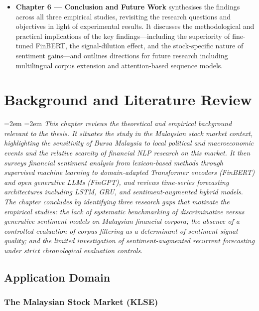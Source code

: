 \documentclass[12pt]{ucetd}
\newcommand{\chapterabstract}[1]{%
  \par\vspace{1em}
  \begingroup
  \leftskip=2em
  \rightskip=2em
  \noindent\itshape
  #1
  \par
  \endgroup
  \vspace{1.5em}
}
\begin{document}
\begin{itemize}
    \item \textbf{Chapter 6 --- Conclusion and Future Work} synthesises the findings across all three empirical studies, revisiting the research questions and objectives in light of experimental results. It discusses the methodological and practical implications of the key findings---including the superiority of fine-tuned FinBERT, the signal-dilution effect, and the stock-specific nature of sentiment gains---and outlines directions for future research including multilingual corpus extension and attention-based sequence models.
\end{itemize}





\chapter{Background and Literature Review}

\chapterabstract{This chapter reviews the theoretical and empirical background relevant to the thesis. It situates the study in the Malaysian stock market context, highlighting the sensitivity of Bursa Malaysia to local political and macroeconomic events and the relative scarcity of financial NLP research on this market. It then surveys financial sentiment analysis from lexicon-based methods through supervised machine learning to domain-adapted Transformer encoders (FinBERT) and open generative LLMs (FinGPT), and reviews time-series forecasting architectures including LSTM, GRU, and sentiment-augmented hybrid models. The chapter concludes by identifying three research gaps that motivate the empirical studies: the lack of systematic benchmarking of discriminative versus generative sentiment models on Malaysian financial corpora; the absence of a controlled evaluation of corpus filtering as a determinant of sentiment signal quality; and the limited investigation of sentiment-augmented recurrent forecasting under strict chronological evaluation controls.}

\section{Application Domain}
\subsection{The Malaysian Stock Market (KLSE)}
\end{document}
